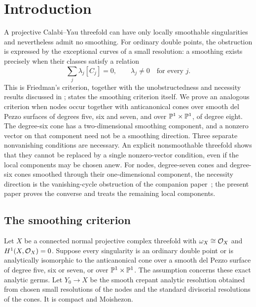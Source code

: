 \section{Introduction}\label{sec:intro}

A projective Calabi--Yau threefold can have only locally smoothable
singularities and nevertheless admit no smoothing.  For ordinary double
points, the obstruction is expressed by the exceptional curves of a small
resolution: a smoothing exists precisely when their classes satisfy a
relation
\begin{equation}\label{eq:friedman}
 \sum_j\lambda_j[C_j]=0,\qquad \lambda_j\ne0\quad\text{for every }j.
\end{equation}
This is Friedman's criterion, together with the unobstructedness and
necessity results discussed in \cite{Friedman86,Namikawa94,RT09};
\cite[Thm.~1.3]{RT09} states the smoothing criterion itself.
We prove an analogous criterion when nodes occur together with
anticanonical cones over smooth del Pezzo surfaces of degrees five, six and seven,
and over $\mathbb{P}^1\times\mathbb{P}^1$, of degree eight.
The degree-six cone has a two-dimensional smoothing component, and a
nonzero vector on that component need not be a smoothing direction.
Three separate nonvanishing conditions are necessary.  An explicit
nonsmoothable threefold shows that they cannot be replaced by a single
nonzero-vector condition, even if the local components may be chosen anew.
For nodes, degree-seven cones and degree-six cones smoothed through their
one-dimensional component, the necessity direction is the vanishing-cycle
obstruction of the companion paper~\cite{PaperIV}; the present paper proves
the converse and treats the remaining local components.

\subsection{The smoothing criterion}
Let $X$ be a connected normal projective complex threefold with
$\omega_X\cong\mathcal{O}_X$ and $H^1(X,\mathcal{O}_X)=0$.  Suppose every singularity is
an ordinary double point or is analytically isomorphic to the
anticanonical cone over a smooth del Pezzo surface of degree five, six or seven,
or over $\mathbb{P}^1\times\mathbb{P}^1$.
The assumption concerns these exact analytic germs.
Let $Y_0\to X$ be the smooth crepant analytic resolution obtained from
chosen small resolutions of the nodes and the standard divisorial
resolutions of the cones.  It is compact and Moishezon.

